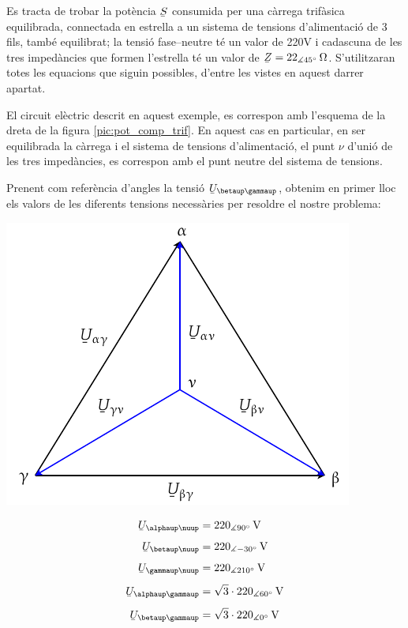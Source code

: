 \begin{exemple}
    Es tracta de trobar la pot\`{e}ncia $\cmplx{S}$ consumida per una c\`{a}rrega
    trif\`{a}sica equilibrada, connectada en estrella a un sistema de tensions
    d'alimentaci\'{o}  de 3 fils, tamb\'{e} equilibrat; la tensi\'{o} fase--neutre
    t\'{e} un valor de 220\unit{V} i cadascuna de les tres  imped\`{a}ncies
    que formen l'estrella t\'{e} un valor de $\cmplx{Z}=22_{\measuredangle
    45\degree}\unit{\ohm}$. S'utilitzaran totes les equacions que
    siguin possibles, d'entre les vistes en aquest darrer apartat.

    El circuit el\`{e}ctric descrit en aquest exemple, es correspon amb
    l'esquema de la dreta de la figura \vref{pic:pot_comp_trif}. En
    aquest cas en particular, en ser equilibrada la c\`{a}rrega i el
    sistema de tensions d'alimentaci\'{o}, el punt $\nu$ d'uni\'{o} de  les tres imped\`{a}ncies, es
    correspon amb el punt neutre del sistema de tensions.

    Prenent com refer\`{e}ncia d'angles la tensi\'{o}
    $\cmplx{U}_{\betaup\gammaup}$, obtenim en primer lloc els valors de
    les diferents tensions necess\`{a}ries per resoldre el nostre
    problema:

    \hfill
    \begin{minipage}[b]{7.5cm}
        \includegraphics{Imatges/Cap-Fonaments-Potencia-Exemple.pdf}
    \end{minipage}
    \hfill
    \begin{minipage}[b][5.7cm][t]{3.8cm}
    \begin{align*}
        \cmplx{U}_{\alphaup\nuup} &= 220_{\measuredangle 90\degree}\unit{V} \\[1ex]
        \cmplx{U}_{\betaup\nuup} &= 220_{\measuredangle -30\degree}\unit{V} \\[1ex]
        \cmplx{U}_{\gammaup\nuup} &= 220_{\measuredangle 210\degree}\unit{V} \\[1ex]
        \cmplx{U}_{\alphaup\gammaup} &= \sqrt{3}\cdot220_{\measuredangle 60\degree}\unit{V} \\[1ex]
        \cmplx{U}_{\betaup\gammaup} &= \sqrt{3}\cdot220_{\measuredangle 0\degree}\unit{V}
    \end{align*}
    \end{minipage}
    \hfill{}


\end{exemple}
